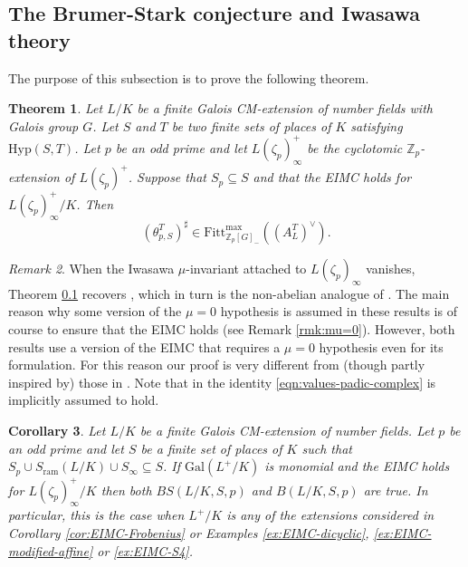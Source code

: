 \documentclass[12pt]{amsart}
\theoremstyle{plain}
\newtheorem{theorem}{Theorem}[section]
\newtheorem{corollary}[theorem]{Corollary}
\theoremstyle{remark}
\newtheorem{remark}[theorem]{Remark}
\theoremstyle{definition}
\numberwithin{equation}{section}
\begin{document}
{\subsection{The Brumer-Stark conjecture and Iwasawa theory}\label{subsec:brumer-stark-and-Iwasawa-theory}
The purpose of this subsection is to prove the following theorem.
\begin{theorem}\label{thm:EIMC-implies-BS}
Let $L/K$ be a finite Galois CM-extension of number fields with Galois group $G$.
Let $S$ and $T$ be two finite sets of places of $K$ satisfying ${\mathrm{Hyp}}(S,T)$.
Let $p$ be an odd prime and
let $L(\zeta_p)^{+}_{\infty}$ be the cyclotomic ${\mathbb{Z}}_{p}$-extension of $L(\zeta_p)^{+}$.
Suppose that $S_{p} \subseteq S$ and that the EIMC holds for $L(\zeta_p)^{+}_{\infty} / K$. Then
\begin{equation}\label{eqn:strongBS}
    (\theta_{p,S}^{T})^{\sharp} \in {\mathrm{Fitt}}^{\max}_{{\mathbb{Z}}_{p}[G]_{-}}((A_{L}^{T})^{\vee}).
\end{equation}
\end{theorem}

\begin{remark}
When the Iwasawa $\mu$-invariant attached to $L(\zeta_{p})_{\infty}$ vanishes, 
Theorem \ref{subsec:brumer-stark-and-Iwasawa-theory} recovers \cite[Theorem 4.5]{MR3072281},
which in turn is the non-abelian analogue of \cite[Theorem 6.5]{GrP-EIMC}. 
The main reason why some version of the $\mu=0$ hypothesis is assumed in these results
is of course to ensure that the EIMC holds (see Remark \ref{rmk:mu=0}).
However, both results use a version of the EIMC that requires a $\mu=0$ hypothesis even for its formulation.
For this reason our proof is very different from (though partly inspired by) those in
\cite{GrP-EIMC,MR3072281}. 
Note that in \cite[\S 4]{MR3072281} the identity \eqref{eqn:values-padic-complex} is implicitly assumed to hold.
\end{remark}

\begin{corollary} \label{cor:BS-holds}
Let $L/K$ be a finite Galois CM-extension of number fields.
Let $p$ be an odd prime and 
let $S$ be a finite set of places of $K$ such that $S_{p} \cup S_{\mathrm{ram}}(L/K) \cup S_{\infty} \subseteq S$.
If ${\mathrm{Gal}}(L^{+}/K)$ is monomial and the EIMC holds for $L(\zeta_p)^{+}_{\infty} / K$ then both $BS(L/K,S,p)$ and $B(L/K,S,p)$ are true.
In particular, this is the case when  $L^{+}/K$ is any of the extensions considered in Corollary \ref{cor:EIMC-Frobenius}
or Examples \ref{ex:EIMC-dicyclic}, \ref{ex:EIMC-modified-affine} or \ref{ex:EIMC-S4}.
\end{corollary}

}
\end{document}
